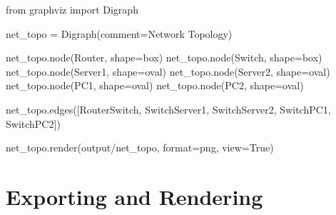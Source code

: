 \documentclass[
  letterpaper,
  DIV=11,
  numbers=noendperiod]{scrreprt}
\newenvironment{Shaded}{\begin{snugshade}}{\end{snugshade}}
\newcommand{\BuiltInTok}[1]{\textcolor[rgb]{0.00,0.23,0.31}{#1}}
\newcommand{\ImportTok}[1]{\textcolor[rgb]{0.00,0.46,0.62}{#1}}
\newcommand{\NormalTok}[1]{\textcolor[rgb]{0.00,0.23,0.31}{#1}}
\newcommand{\OperatorTok}[1]{\textcolor[rgb]{0.37,0.37,0.37}{#1}}
\newcommand{\StringTok}[1]{\textcolor[rgb]{0.13,0.47,0.30}{#1}}
\newcommand{\VariableTok}[1]{\textcolor[rgb]{0.07,0.07,0.07}{#1}}
\begin{document}
\begin{Shaded}
\begin{Highlighting}[]
\ImportTok{from}\NormalTok{ graphviz }\ImportTok{import}\NormalTok{ Digraph}

\NormalTok{net\_topo }\OperatorTok{=}\NormalTok{ Digraph(comment}\OperatorTok{=}\StringTok{\textquotesingle{}Network Topology\textquotesingle{}}\NormalTok{)}

\NormalTok{net\_topo.node(}\StringTok{\textquotesingle{}Router\textquotesingle{}}\NormalTok{, shape}\OperatorTok{=}\StringTok{\textquotesingle{}box\textquotesingle{}}\NormalTok{)}
\NormalTok{net\_topo.node(}\StringTok{\textquotesingle{}Switch\textquotesingle{}}\NormalTok{, shape}\OperatorTok{=}\StringTok{\textquotesingle{}box\textquotesingle{}}\NormalTok{)}
\NormalTok{net\_topo.node(}\StringTok{\textquotesingle{}Server1\textquotesingle{}}\NormalTok{, shape}\OperatorTok{=}\StringTok{\textquotesingle{}oval\textquotesingle{}}\NormalTok{)}
\NormalTok{net\_topo.node(}\StringTok{\textquotesingle{}Server2\textquotesingle{}}\NormalTok{, shape}\OperatorTok{=}\StringTok{\textquotesingle{}oval\textquotesingle{}}\NormalTok{)}
\NormalTok{net\_topo.node(}\StringTok{\textquotesingle{}PC1\textquotesingle{}}\NormalTok{, shape}\OperatorTok{=}\StringTok{\textquotesingle{}oval\textquotesingle{}}\NormalTok{)}
\NormalTok{net\_topo.node(}\StringTok{\textquotesingle{}PC2\textquotesingle{}}\NormalTok{, shape}\OperatorTok{=}\StringTok{\textquotesingle{}oval\textquotesingle{}}\NormalTok{)}

\NormalTok{net\_topo.edges([}\StringTok{\textquotesingle{}RouterSwitch\textquotesingle{}}\NormalTok{, }\StringTok{\textquotesingle{}SwitchServer1\textquotesingle{}}\NormalTok{, }\StringTok{\textquotesingle{}SwitchServer2\textquotesingle{}}\NormalTok{, }\StringTok{\textquotesingle{}SwitchPC1\textquotesingle{}}\NormalTok{, }\StringTok{\textquotesingle{}SwitchPC2\textquotesingle{}}\NormalTok{])}

\NormalTok{net\_topo.render(}\StringTok{\textquotesingle{}output/net\_topo\textquotesingle{}}\NormalTok{, }\BuiltInTok{format}\OperatorTok{=}\StringTok{\textquotesingle{}png\textquotesingle{}}\NormalTok{, view}\OperatorTok{=}\VariableTok{True}\NormalTok{)}
\end{Highlighting}
\end{Shaded}

\section{Exporting and Rendering}\label{exporting-and-rendering}
\end{document}
